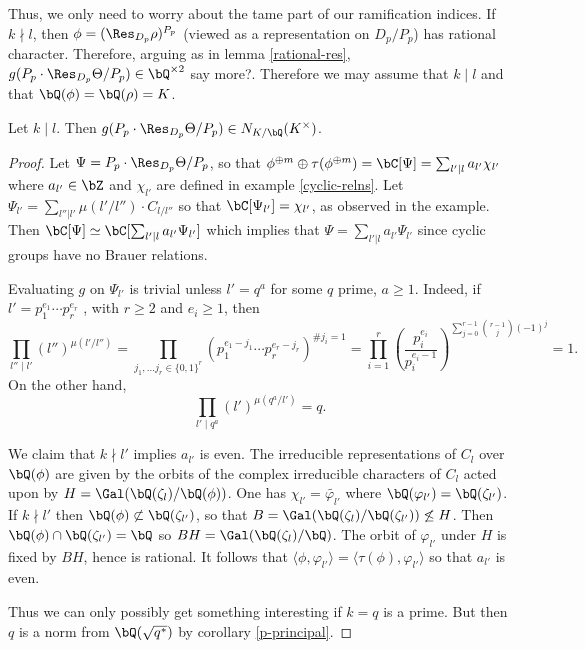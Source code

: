 Thus, we only need to worry about the tame part of our ramification indices. If $k \nmid l$, then $\phi = (\Res_{D_p} \rho)^{P_p}$ (viewed as a representation on $D_p / P_p$) has rational character. Therefore, arguing as in lemma \ref{rational-res}, $g(P_p \cdot \Res_{D_p}\Theta / P_p) \in \bQ^{\times 2}$ {\color{red} say more?}.
Therefore we may assume that $k \mid l$ and that $\bQ(\phi) = \bQ(\rho) = K$.

\begin{prop}
    Let $k \mid l$. Then $g(P_p \cdot \Res_{D_p}\Theta / P_p) \in N_{K / \bQ}(K^{\times})$.   
\end{prop}

\begin{proof}
    Let $\Psi = P_p \cdot \Res_{D_p}\Theta / P_p$, so that $\phi^{\oplus m} \oplus \tau(\phi^{\oplus m}) = \bC[\Psi] = \sum_{l' \mid l}{a_{l'}} \chi_{l'}$ where $a_{l'} \in \bZ$ and $\chi_{l'}$ are defined in example \ref{cyclic-relns}. Let $\Psi_{l'} = \sum_{l'' | l'}\mu(l' / l'')\cdot C_{l / l''}$ so that $\bC[\Psi_{l'}] = \chi_{l'}$, as observed in the example. Then $\bC[\Psi] \simeq \bC[\sum_{l' | l } a_{l'} \Psi_{l'}]$ which implies that $\Psi = \sum_{l' | l } a_{l'} \Psi_{l'}$ since cyclic groups have no Brauer relations.

    Evaluating $g$ on $\Psi_{l'}$ is trivial unless $l' = q^a$ for some $q$ prime, $a \geq 1$. Indeed, if $l' = p_1^{e_1} \cdots p_r^{e_r}$ , with $r \geq 2$ and $e_i \geq 1$, then
    \[ \prod_{l'' \mid l'} (l'')^{\mu(l' / l'')} = \prod_{j_1, \ldots j_r \in \{0,1\}^r } \left(p_1^{e_1 - j_1} \cdots p_r^{e_r - j_r}\right)^{\# j_i = 1} = \prod_{i = 1}^r \left(\frac{p_i^{e_i}}{p_i^{e_i - 1}}\right)^{\sum_{ j = 0}^{r - 1} \binom{r-1}{j} (-1)^j} = 1. \]
    On the other hand,
    \[ \prod_{l' \mid q^a} (l')^{\mu(q^a / l')} = q .\]
    
    We claim that $k \nmid l'$ implies $a_{l'}$ is even. The irreducible representations of $C_l$ over $\bQ(\phi)$ are given by the orbits of the complex irreducible characters of $C_l$ acted upon by $H = \Gal (\bQ(\zeta_l) / \bQ(\phi))$. One has $\chi_{l'} = \widetilde{\varphi_{l'}}$ where $\bQ(\varphi_{l'}) = \bQ(\zeta_{l'})$. If $ k \nmid l'$ then $\bQ(\phi) \not\subset \bQ(\zeta_{l'})$, so that $B = \Gal(\bQ(\zeta_l) / \bQ(\zeta_{l'})) \not\leq H$. Then $\bQ(\phi) \cap \bQ(\zeta_{l'}) = \bQ$ so $BH = \Gal(\bQ(\zeta_l) / \bQ)$. The orbit of $\varphi_{l'}$ under $H$ is fixed by $BH$, hence is rational. It follows that $\langle \phi, \varphi_{l'} \rangle = \langle \tau(\phi) , \varphi_{l'} \rangle$ so that $a_{l'}$ is even.  

    Thus we can only possibly get something interesting if $k = q$ is a prime. But then $q$ is a norm from $\bQ(\sqrt{q^*})$ by corollary \ref{p-principal}. 
\end{proof}

